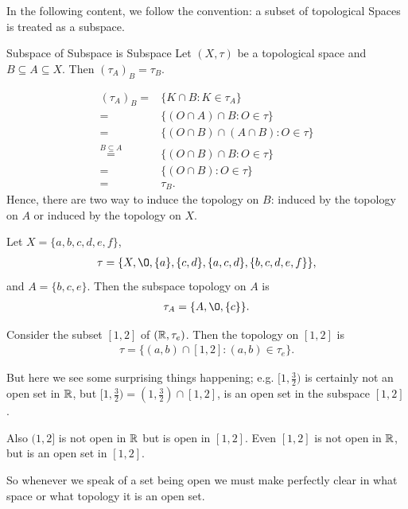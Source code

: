 In the following content,  we follow the convention: a subset of topological Spaces is treated as a subspace. 
\begin{proposition}{}{Subspace of Subspace is Subspace}
    Let $(X,\tau)$ be a topological space and $B\subseteq A\subseteq X$. Then $(\tau_A)_B=\tau_B$.
\end{proposition}

\begin{align*}
    (\tau_A)_B = & \{K\cap B:K\in \tau_A\} \\
        =  &\{(O\cap A)\cap B: O\in\tau\} \\
        =  &\{(O\cap B)\cap (A\cap B): O\in \tau\}\\
        \overset{B\subseteq A}{=}  &\{(O\cap B)\cap B: O\in \tau\}\\
        =  &\{(O\cap B): O\in \tau\}\\
        =  &\tau_B.
\end{align*}
Hence, there are two way to induce the topology on $B$: induced by the topology on $A$ or
induced by the topology on $X$.

\begin{example}{}{}
    Let $X=\{a,b,c,d,e,f\}$, 
    \begin{align*}
        \tau = \{X,\O, \{a\}, \{c,d\}, \{a,c,d\}, \{b,c,d,e,f\}\},
    \end{align*}
    and $A=\{b,c,e\}$. Then the subspace topology on $A$ is 
    \begin{align*}
        \tau_A = \{A,\O, \{c\}\}.
    \end{align*}
\end{example}


Consider the subset $[1,2]$ of $(\mathbb{R},\tau_e)$. Then the topology on $[1,2]$ is 
\begin{align*}
    \tau = \{(a,b)\cap [1,2]: (a,b)\in \tau_e\}.
\end{align*}
\par
But here we see some surprising things happening; e.g.
$[1,\frac{3}{2})$ is certainly not an open set in $\mathbb{R}$, but $[1,\frac{3}{2})=(1,\frac{3}{2})\cap [1,2]$, is an open set in the subspace $[1,2]$.
\par
Also $(1,2]$ is not open in $\mathbb{R}$ but is open in $[1,2]$. Even $[1,2]$ is not open in $\mathbb{R}$, but is an open set in $[1,2]$.
\par
So whenever we speak of a set being open we must make perfectly clear in what space or what topology it is an open set. 

